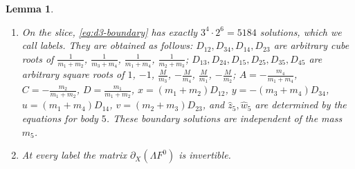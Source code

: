 \documentclass[11pt]{amsart}
\newenvironment{alphalist}{\begin{enumerate}\renewcommand{\labelenumi}{(\alph{enumi})}%
  \renewcommand{\theenumi}{\alph{enumi}}}{\end{enumerate}}
\newtheorem{lemma}[theorem]{Lemma}
\theoremstyle{definition}
\theoremstyle{remark}
\begin{document}
{\begin{lemma}\label{lem:d3-fibre}
\begin{alphalist}
  \item On the slice, \eqref{eq:d3-boundary} has exactly $3^4\cdot2^6=5184$ solutions, which we call
  \emph{labels}. They are obtained as follows: $D_{12},D_{34},D_{14},D_{23}$ are arbitrary cube roots of $\frac1{m_1+m_2}$,
  $\frac1{m_3+m_4}$, $\frac1{m_1+m_4}$, $\frac1{m_2+m_3}$; $D_{13},D_{24},D_{15},D_{25},D_{35},
  D_{45}$ are arbitrary square roots of $1$, $-1$, $\frac M{m_3}$, $-\frac M{m_4}$, $\frac M{m_1}$,
  $-\frac M{m_2}$; $A=-\frac{m_4}{m_1+m_4}$, $C=-\frac{m_2}{m_1+m_2}$, $D=\frac{m_1}{m_1+m_2}$,
  $x=(m_1+m_2)D_{12}$, $y=-(m_3+m_4)D_{34}$, $u=(m_1+m_4)D_{14}$, $v=(m_2+m_3)D_{23}$, and
  $\hat z_5,\hat w_5$ are determined by the equations for body $5$. These boundary solutions
  are independent of the mass $m_5$.
\item At every label the matrix $\partial_X(\Lambda F^0)$ is invertible.

\end{alphalist}
\end{lemma}}
\end{document}
